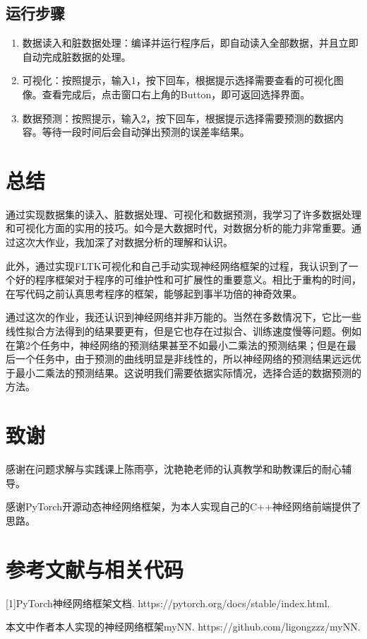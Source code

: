 \documentclass[CJK]{ctexart}
\begin{document}
\subsection{运行步骤}
\begin{enumerate}
    \item 数据读入和脏数据处理：编译并运行程序后，即自动读入全部数据，并且立即自动完成脏数据的处理。
    \item 可视化：按照提示，输入1，按下回车，根据提示选择需要查看的可视化图像。查看完成后，点击窗口右上角的Button，即可返回选择界面。
    \item 数据预测：按照提示，输入2，按下回车，根据提示选择需要预测的数据内容。等待一段时间后会自动弹出预测的误差率结果。
\end{enumerate}

\section{总结}
通过实现数据集的读入、脏数据处理、可视化和数据预测，我学习了许多数据处理和可视化方面的实用的技巧。如今是大数据时代，对数据分析的能力非常重要。通过这次大作业，我加深了对数据分析的理解和认识。\par
此外，通过实现FLTK可视化和自己手动实现神经网络框架的过程，我认识到了一个好的程序框架对于程序的可维护性和可扩展性的重要意义。相比于重构的时间，在写代码之前认真思考程序的框架，能够起到事半功倍的神奇效果。\par
通过这次的作业，我还认识到神经网络并非万能的。当然在多数情况下，它比一些线性拟合方法得到的结果要更有，但是它也存在过拟合、训练速度慢等问题。例如在第2个任务中，神经网络的预测结果甚至不如最小二乘法的预测结果；但是在最后一个任务中，由于预测的曲线明显是非线性的，所以神经网络的预测结果远远优于最小二乘法的预测结果。这说明我们需要依据实际情况，选择合适的数据预测的方法。

\section{致谢}
感谢在问题求解与实践课上陈雨亭，沈艳艳老师的认真教学和助教课后的耐心辅导。\par
感谢PyTorch开源动态神经网络框架，为本人实现自己的C++神经网络前端提供了思路。

\section{参考文献与相关代码}
[1]PyTorch神经网络框架文档. https://pytorch.org/docs/stable/index.html.\par
[2]本文中作者本人实现的神经网络框架myNN. https://github.com/ligongzzz/myNN. 
\end{document}

